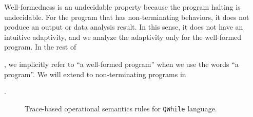 Well-formedness is an undecidable property because the program halting is undecidable.
For the program that has non-terminating behaviors, it does not produce an output or data analysis result.
In this sense, it does not have an intuitive adaptivity, and we analyze the adaptivity only for the well-formed program.
In the rest of {, we implicitly refer to ``a well-formed program'' when we use the words ``a program''. We will extend to non-terminating programs in {.
 

%
%
\begin{figure}
 {
 }
 \caption{Trace-based operational semantics rules for {\tt QWhile} language.}
 \label{fig:os}
 \end{figure}

}}
